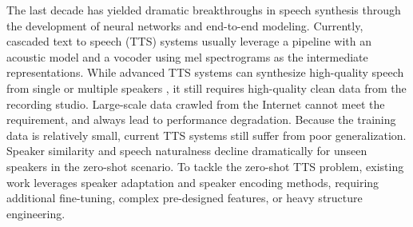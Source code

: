 \documentclass{article}
\theoremstyle{plain}
\theoremstyle{definition}
\theoremstyle{remark}
\begin{document}
 The last decade has yielded dramatic breakthroughs in speech synthesis through the development of neural networks and end-to-end modeling. Currently, cascaded text to speech (TTS) systems \citep{DBLP:conf/icassp/ShenPWSJYCZWRSA18, DBLP:conf/nips/RenRTQZZL19,DBLP:conf/aaai/Li0LZL19} usually leverage a pipeline with an acoustic model and a vocoder using mel spectrograms as the intermediate representations. 
While advanced TTS systems can synthesize high-quality speech from single or multiple speakers \citep{DBLP:conf/interspeech/LiuXH0Z22, DBLP:conf/icml/KimKS21}, it still requires high-quality clean data from the recording studio. Large-scale data crawled from the Internet cannot meet the requirement, and always lead to performance degradation. Because the training data is relatively small, current TTS systems still suffer from poor generalization. Speaker similarity and speech naturalness decline dramatically for unseen speakers in the zero-shot scenario. 
 To tackle the zero-shot TTS problem, existing work leverages speaker adaptation \citep{DBLP:conf/iclr/ChenASBRZWCTLGO19, DBLP:conf/interspeech/WangTFYWZ20} and speaker encoding  \citep{DBLP:conf/nips/ArikCPPZ18,casanova2022yourtts} methods, requiring additional fine-tuning, complex pre-designed features, or heavy structure engineering. 

\end{document}

